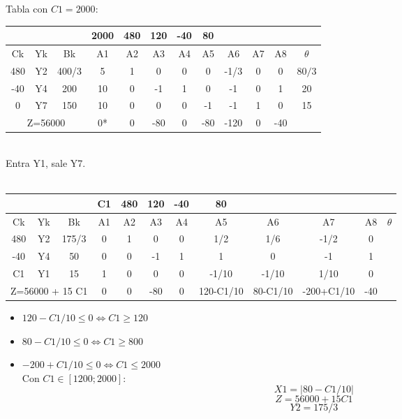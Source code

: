 \documentclass{article}
\begin{document}
\begin{enumerate}
\begin{itemize}
		\end{itemize}
		Tabla con $C1 = 2000$:\\
			\begin{tabular}{|c  c  c | c  c  c  c  c  c  c  c | c |}
			\hline
			 \multicolumn{3}{|c|}{} & 2000 & 480 & 120 & -40 & 80 & & & &\\ \hline
			 Ck & Yk & Bk & A1 & A2 & A3 & A4 & A5 & A6 & A7 & A8 & $\theta$\\ \hline 
			 480 & Y2 & 400/3 & 5 & 1 & 0 & 0 & 0 & -1/3 & 0 & 0 & $80/3$\\
			 -40 & Y4 & 200 & 10 & 0 & -1 & 1 & 0 & -1 & 0 & 1 & 20\\
			 0 & Y7 & 150 & 10 & 0 & 0 & 0 & -1 & -1 & 1 & 0 & 15\\ \hline
			 \multicolumn{3}{|c|}{Z=56000} & 0* & 0 & -80 & 0 & -80 & -120 & 0 & -40 &\\ \hline
		\end{tabular}
		\medskip\\
		Entra Y1, sale Y7.\\ 
		\smallskip\\
		\begin{tabular}{|c  c  c | c  c  c  c  c  c  c  c | c |}
			\hline
			 \multicolumn{3}{|c|}{} & C1 & 480 & 120 & -40 & 80 & & & &\\ \hline
			 Ck & Yk & Bk & A1 & A2 & A3 & A4 & A5 & A6 & A7 & A8 & $\theta$\\ \hline 
			 480 & Y2 & 175/3 & 0 & 1 & 0 & 0 & 1/2 & 1/6 & -1/2 & 0 & \\
			 -40 & Y4 & 50 & 0 & 0 & -1 & 1 & 1 & 0 & -1 & 1 & \\
			 C1 & Y1 & 15 & 1 & 0 & 0 & 0 & -1/10 & -1/10 & 1/10 & 0 & \\ \hline
			 \multicolumn{3}{|c|}{Z=56000 + 15 C1} & 0 & 0 & -80 & 0 & 120-C1/10 & 80-C1/10 & -200+C1/10 & -40 &\\ \hline
		\end{tabular}
		\begin{itemize}
				\item $120 - C1/10 \leq 0 \iff C1 \geq 120$
				\item $80 - C1/10 \leq 0 \iff C1 \geq 800$
				\item $-200 + C1/10 \leq 0 \iff C1 \leq 2000$
					\smallskip\\
					Con $C1 \in [1200; 2000]$:\\
					$$X1 = |80 - C1/10|$$
					$$Z = 56000 + 15 C1$$
					$$Y2 = 175/3$$
		\end{itemize}
		\begin{tabular}{|c  c  c | c  c  c  c  c  c  c  c | c |}

\end{tabular}
\end{enumerate}
\end{document}
